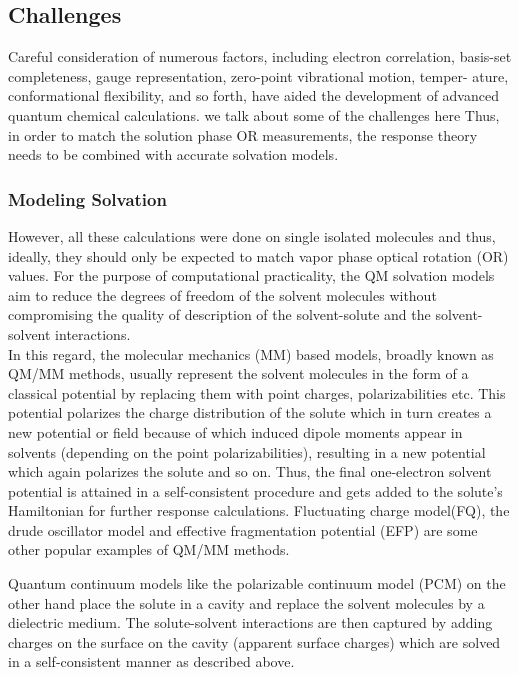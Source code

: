 \subsection{Challenges}
Careful consideration of numerous factors, including electron correlation, basis-set completeness, gauge representation, zero-point vibrational motion, temper- ature, conformational flexibility, and so forth, have aided the development of advanced quantum chemical calculations.
we talk about some of the challenges here
Thus, in order to match the solution phase OR measurements, the response theory needs to be combined with accurate solvation models. \\ 
\subsubsection{Modeling Solvation}
However, all these calculations were done on single isolated molecules and thus, ideally, they should only be
expected to match vapor phase optical rotation (OR) values.
For the purpose of computational practicality, the QM solvation models aim to reduce the degrees of freedom of
the solvent molecules without compromising the quality of description of the solvent-solute and the solvent-solvent
interactions. \\
In this regard, the molecular mechanics (MM) based models, broadly known as QM/MM methods, usually represent the
solvent molecules in the form of a classical potential by replacing them with point charges, polarizabilities etc.\cite{}
This potential polarizes the charge distribution of the solute which in turn creates a new potential or field because of
which induced dipole moments appear in solvents (depending on the point polarizabilities), resulting in a new
potential which again polarizes the solute and so on. Thus, the final one-electron solvent potential is attained in a
self-consistent procedure and gets added to the solute's Hamiltonian for further response calculations. Fluctuating
charge model(FQ)\cite{}, the drude oscillator model\cite{} and effective fragmentation potential (EFP)\cite{} are some
other popular examples of QM/MM methods.

Quantum continuum models like the polarizable continuum model (PCM)\cite{}
on the other hand place the solute in a cavity and replace the solvent molecules by a dielectric medium. The
solute-solvent interactions are then captured by adding charges on the surface on the cavity (apparent surface charges)
which are solved in a self-consistent manner as described above.\\


